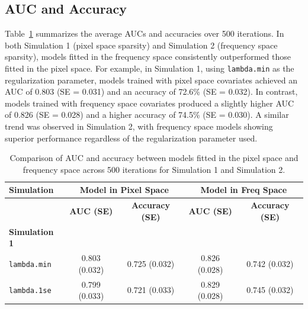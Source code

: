 \documentclass[12pt]{article}
\begin{document}
\subsection*{AUC and Accuracy}

Table~\ref*{tab:auc_acc_table} summarizes the average AUCs and accuracies over 500 iterations. In both Simulation 1 (pixel space sparsity) and Simulation 2 (frequency space sparsity), models fitted in the frequency space consistently outperformed those fitted in the pixel space. For example, in Simulation 1, using \texttt{lambda.min} as the regularization parameter, models trained with pixel space covariates achieved an AUC of 0.803 (SE = 0.031) and an accuracy of 72.6\% (SE = 0.032). In contrast, models trained with frequency space covariates produced a slightly higher AUC of 0.826 (SE = 0.028) and a higher accuracy of 74.5\% (SE = 0.030). A similar trend was observed in Simulation 2, with frequency space models showing superior performance regardless of the regularization parameter used.

\begin{table}[H]
	\centering
	\caption{Comparison of AUC and accuracy between models fitted in the pixel space and frequency space across 500 iterations for Simulation 1 and Simulation 2.}
	\label{tab:auc_acc_table}
	\begin{tabular}{l|cc|cc}
		\toprule
		\textbf{Simulation}   & \multicolumn{2}{c}{\textbf{Model in Pixel Space}} & \multicolumn{2}{c}{\textbf{Model in Freq Space}}                                              \\
		\midrule
		                      & \textbf{AUC (SE)}                                 & \textbf{Accuracy (SE)}                           & \textbf{AUC (SE)} & \textbf{Accuracy (SE)} \\
		\midrule
		\textbf{Simulation 1} &                                                   &                                                  &                   &                        \\
		\texttt{lambda.min}   & 0.803 (0.032)                                     & 0.725 (0.032)                                    & 0.826 (0.028)     & 0.742 (0.032)          \\
		\texttt{lambda.1se}   & 0.799 (0.033)                                     & 0.721 (0.033)                                    & 0.829 (0.028)     & 0.745 (0.032)          \\
		\bottomrule
	\end{tabular}
\end{table}
\end{document}
